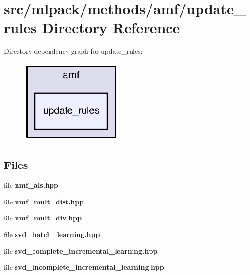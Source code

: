 \section{src/mlpack/methods/amf/update\+\_\+rules Directory Reference}
\label{dir_d2d4272c0c3066ecaa6136c65bce4822}
Directory dependency graph for update\+\_\+rules\+:
\nopagebreak
\begin{figure}[H]
\begin{center}
\leavevmode
\includegraphics[width=148pt]{dir_d2d4272c0c3066ecaa6136c65bce4822_dep}
\end{center}
\end{figure}
\subsection*{Files}
\begin{DoxyCompactItemize}
\item 
file {\bf nmf\+\_\+als.\+hpp}
\item 
file {\bf nmf\+\_\+mult\+\_\+dist.\+hpp}
\item 
file {\bf nmf\+\_\+mult\+\_\+div.\+hpp}
\item 
file {\bf svd\+\_\+batch\+\_\+learning.\+hpp}
\item 
file {\bf svd\+\_\+complete\+\_\+incremental\+\_\+learning.\+hpp}
\item 
file {\bf svd\+\_\+incomplete\+\_\+incremental\+\_\+learning.\+hpp}
\end{DoxyCompactItemize}
